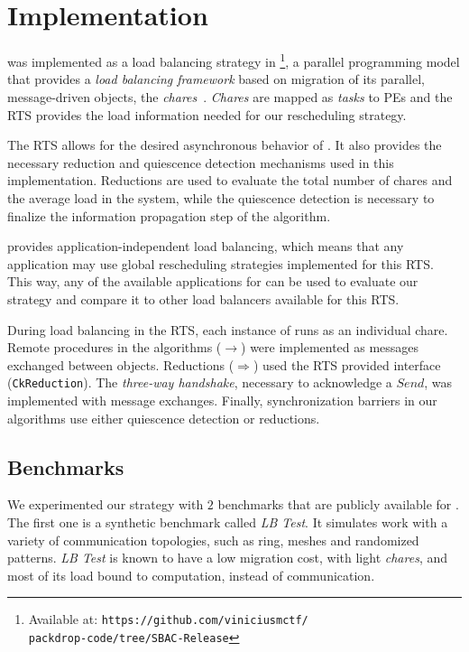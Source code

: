 \section{Implementation} \label{sec:impl}

\packdrop was implemented as a load balancing strategy in \charm\footnote{Available at: \texttt{https://github.com/viniciusmctf/\\packdrop-code/tree/SBAC-Release}}, a parallel programming model that provides a \textit{load balancing framework} based on migration of its parallel, message-driven objects, the \textit{chares}~\cite{CharmLOTR}.
\textit{Chares} are mapped as \textit{tasks} to PEs and the \charm RTS provides the load information needed for our rescheduling strategy.

The \charm RTS allows for the desired asynchronous behavior of \packdrop.
It also provides the necessary reduction and quiescence detection mechanisms used in this implementation.
Reductions are used to evaluate the total number of chares and the average load in the system, while the quiescence detection is necessary to finalize the information propagation step of the algorithm.

\charm provides application-independent load balancing, which means that any application may use global rescheduling strategies implemented for this RTS.
This way, any of the available applications for \charm can be used to evaluate our strategy and compare it to other load balancers available for this RTS.

During load balancing in the \charm RTS, each instance of \packdrop runs as an individual chare.
Remote procedures in the algorithms ($\rightarrow$) were implemented as messages exchanged between objects.
Reductions ($\Rightarrow$) used the RTS provided interface ({\small\texttt{CkReduction}}).
The \textit{three-way handshake}, necessary to acknowledge a $Send$, was implemented with message exchanges.
Finally, synchronization barriers in our algorithms use either quiescence detection or reductions.

\subsection{Benchmarks} \label{sec:benchmarks}

We experimented our strategy with $2$ benchmarks that are publicly available for \charm.
The first one is a synthetic benchmark called \textit{LB Test}. 
It simulates work with a variety of communication topologies, such as ring, meshes and randomized patterns.
\textit{LB Test} is known to have a low migration cost, with light \textit{chares}, and most of its load bound to computation, instead of communication.


